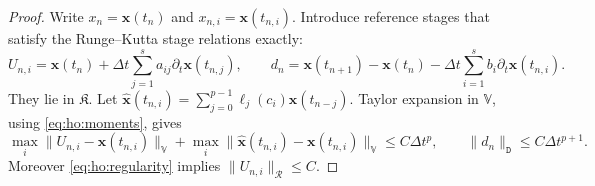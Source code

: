\documentclass[11pt,a4paper]{article}
\newcommand{\bs}{\boldsymbol}
\newcommand{\dt}{\Delta t}
\newcommand{\V}{\mathbb V}
\newcommand{\DD}{\mathtt D}
\theoremstyle{definition}
\numberwithin{equation}{section}
\begin{document}
\begin{proof}
Write $x_n=\bs x(t_n)$ and $x_{n,i}=\bs x(t_{n,i})$. Introduce reference stages
that satisfy the Runge--Kutta stage relations exactly:
\begin{equation}\label{eq:ho:reference-stages}
 U_{n,i}=\bs x(t_n)+\dt\sum_{j=1}^s a_{ij}\partial_t\bs x(t_{n,j}),\qquad
 d_n=\bs x(t_{n+1}) - \bs x(t_n)-\dt\sum_{i=1}^s b_i\partial_t\bs x(t_{n,i}).
\end{equation}
They lie in $\mathfrak K$. Let
$\widehat{\bs x}(t_{n,i})=\sum_{j=0}^{p-1}\ell_j(c_i)\bs x(t_{n-j})$.
Taylor expansion in $\V$, using \eqref{eq:ho:moments}, gives
\begin{equation}\label{eq:ho:reference-bounds}
 \max_i\|U_{n,i}-\bs x(t_{n,i})\|_{\V}
 +\max_i\|\widehat{\bs x}(t_{n,i})-\bs x(t_{n,i})\|_{\V}\le C\dt^p,
 \qquad \|d_n\|_{\DD}\le C\dt^{p+1}.
\end{equation}
Moreover \eqref{eq:ho:regularity} implies
$\|U_{n,i}\|_{\mathcal R}\le C$.


\end{proof}
\end{document}
